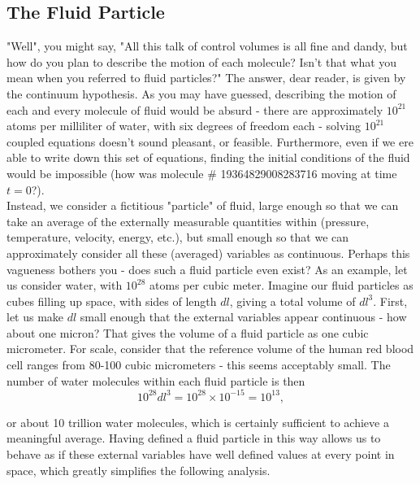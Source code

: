 \subsection{The Fluid Particle}

"Well", you might say, "All this talk of control volumes is all fine and dandy, but how do you plan to describe the motion of each molecule? Isn't that what you mean when you referred to fluid particles?" The answer, dear reader, is given by the continuum hypothesis. As you may have guessed, describing the motion of each and every molecule of fluid would be absurd - there are approximately $10^{21}$ atoms per milliliter of water, with six degrees of freedom each - solving $10^{21}$ coupled equations doesn't sound pleasant, or feasible. Furthermore, even if we ere able to write down this set of equations, finding the initial conditions of the fluid would be impossible (how was molecule \# 19364829008283716 moving at time $t=0$?). \\

Instead, we consider a fictitious "particle" of fluid, large enough so that we can take an average of the externally measurable quantities within (pressure, temperature, velocity, energy, etc.), but small enough so that we can approximately consider all these (averaged) variables as continuous. Perhaps this vagueness bothers you - does such a fluid particle even exist? As an example, let us consider water, with $10^{28}$ atoms per cubic meter. Imagine our fluid particles as cubes filling up space, with sides of length $dl$, giving a total volume of $dl^3$. First, let us make $dl$ small enough that the external variables appear continuous - how about one micron? That gives the volume of a fluid particle as one cubic micrometer. For scale, consider that the reference volume of the human red blood cell ranges from 80-100 cubic micrometers\cite{Fischer1983} - this seems acceptably small. The number of water molecules within each fluid particle is then 
\begin{equation}
10^{28}dl^3 = 10^{28} \times 10^{-15} = 10^{13},
\end{equation}   

or about 10 trillion water molecules, which is certainly sufficient to achieve a meaningful average. Having defined a fluid particle in this way allows us to behave as if these external variables have well defined values at every point in space, which greatly simplifies the following analysis. 

